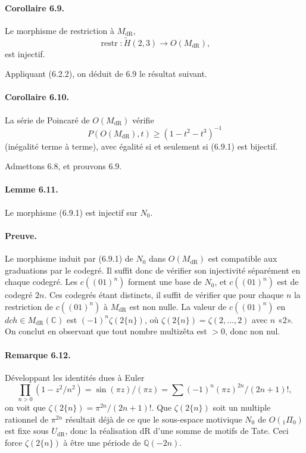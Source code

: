 \documentclass[10pt]{article}
\newcommand{\Q}{\mathbb Q}
\newcommand{\C}{\mathbb C}
\newcommand{\dR}{\mathrm{dR}}
\begin{document}
\paragraph{Corollaire 6.9.}
Le morphisme de restriction à $M_{\dR}$,
\begin{equation}
\operatorname{restr}:\widetilde H(2,3)\longrightarrow O(M_{\dR}),
\tag{6.9.1}
\end{equation}
est injectif.

Appliquant (6.2.2), on déduit de 6.9 le résultat suivant.

\paragraph{Corollaire 6.10.}
La série de Poincaré de $O(M_{\dR})$ vérifie
\begin{equation}
P(O(M_{\dR}),t)\geq(1-t^2-t^3)^{-1}
\tag{6.10.1}
\end{equation}
(inégalité terme à terme), avec égalité si et seulement si (6.9.1) est bijectif.

Admettons 6.8, et prouvons 6.9.

\paragraph{Lemme 6.11.}
Le morphisme (6.9.1) est injectif sur $N_0$.

\paragraph{Preuve.}
Le morphisme induit par (6.9.1) de $N_0$ dans $O(M_{\dR})$ est compatible aux graduations par le codegré. Il suffit donc de vérifier son injectivité séparément en chaque codegré. Les $c((01)^n)$ forment une base de $N_0$, et $c((01)^n)$ est de codegré $2n$. Ces codegrés étant distincts, il suffit de vérifier que pour chaque $n$ la restriction de $c((01)^n)$ à $M_{\dR}$ est non nulle. La valeur de $c((01)^n)$ en $dch\in M_{\dR}(\C)$ est $(-1)^n\zeta(2\{n\})$, où $\zeta(2\{n\})=\zeta(2,\ldots,2)$ avec $n$ «2». On conclut en observant que tout nombre multizêta est $>0$, donc non nul.

\paragraph{Remarque 6.12.}
Développant les identités dues à Euler
\[
\prod_{n>0}(1-z^2/n^2)=\sin(\pi z)/(\pi z)=\sum (-1)^n(\pi z)^{2n}/(2n+1)!,
\]
on voit que $\zeta(2\{n\})=\pi^{2n}/(2n+1)!$. Que $\zeta(2\{n\})$ soit un multiple rationnel de $\pi^{2n}$ résultait déjà de ce que le sous-espace motivique $N_0$ de $O({}_1\Pi_0)$ est fixe sous $U_{\dR}$, donc la réalisation dR d'une somme de motifs de Tate. Ceci force $\zeta(2\{n\})$ à être une période de $\Q(-2n)$.
\end{document}
